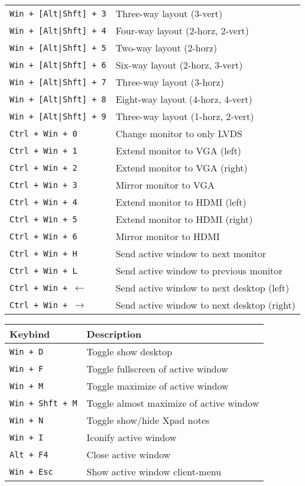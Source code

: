 \documentclass[letterpaper,12pt]{article}
\begin{document}
\begin{table}[H]
\begin{tabular}{|C{5cm}|L{10cm}|}
    {\tt Win + [Alt|Shft] + 3} & Three-way layout (3-vert) \\
    {\tt Win + [Alt|Shft] + 4} & Four-way layout (2-horz, 2-vert) \\
    {\tt Win + [Alt|Shft] + 5} & Two-way layout (2-horz) \\
    {\tt Win + [Alt|Shft] + 6} & Six-way layout (2-horz, 3-vert) \\
    {\tt Win + [Alt|Shft] + 7} & Three-way layout (3-horz) \\
    {\tt Win + [Alt|Shft] + 8} & Eight-way layout (4-horz, 4-vert) \\
    {\tt Win + [Alt|Shft] + 9} & Three-way layout (1-horz, 2-vert) \\
    \hline
    {\tt Ctrl + Win + 0} & Change monitor to only LVDS \\
    {\tt Ctrl + Win + 1} & Extend monitor to VGA (left) \\
    {\tt Ctrl + Win + 2} & Extend monitor to VGA (right) \\
    {\tt Ctrl + Win + 3} & Mirror monitor to VGA \\
    {\tt Ctrl + Win + 4} & Extend monitor to HDMI (left) \\
    {\tt Ctrl + Win + 5} & Extend monitor to HDMI (right) \\
    {\tt Ctrl + Win + 6} & Mirror monitor to HDMI \\
    {\tt Ctrl + Win + H} & Send active window to next monitor \\
    {\tt Ctrl + Win + L} & Send active window to previous monitor \\
    {\tt Ctrl + Win + $\leftarrow$} & Send active window to next desktop (left) \\
    {\tt Ctrl + Win + $\rightarrow$} & Send active window to next desktop (right) \\
    \hline
  \end{tabular}
\end{table}

\begin{table}[H]
  \begin{tabular}{|C{5cm}|L{10cm}|}
    \hline
    \textbf{Keybind} & \textbf{Description} \\
    \hline
    {\tt Win + D} & Toggle show desktop \\
    {\tt Win + F} & Toggle fullscreen of active window \\
    {\tt Win + M} & Toggle maximize of active window \\
    {\tt Win + Shft + M} & Toggle almost maximize of active window \\
    {\tt Win + N} & Toggle show/hide Xpad notes \\
    {\tt Win + I} & Iconify active window \\
    {\tt Alt + F4} & Close active window \\
    {\tt Win + Esc} & Show active window client-menu \\
    \hline
  \end{tabular}
\end{table}
\end{document}
